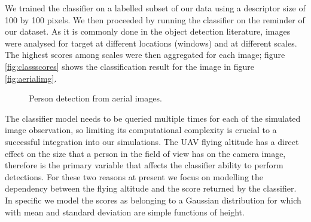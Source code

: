 \documentclass[a4paper,11pt]{report}
\begin{document}
We trained the classifier on a labelled subset of our data using a descriptor size of 100 by 100 pixels. We then proceeded by running the classifier on the reminder of our dataset. As it is commonly done in the object detection literature, images were analysed for target at different locations (windows) and at different scales. The highest scores among scales were then aggregated for each image; figure \ref{fig:classscores} shows the classification result for the image in figure \ref{fig:aerialimg}.
\begin{figure}[ht]
\centering
{}
\caption{Person detection from aerial images.\label{fig:persdetect}}
\end{figure}

The classifier model needs to be queried multiple times for each of the simulated image observation, so limiting its computational complexity is crucial to a successful integration into our simulations.
The UAV flying altitude has a direct effect on the size that a person in the field of view has on the camera image, therefore is the primary variable that affects the classifier ability to perform detections.
For these two reasons at present we focus on modelling the dependency between the flying altitude and the score returned by the classifier. In specific we model the scores as belonging to a Gaussian distribution for which with mean and standard deviation are simple functions of height.
\end{document}
